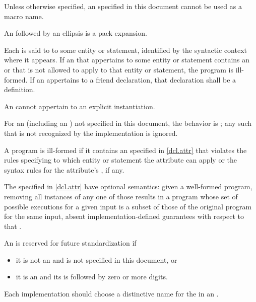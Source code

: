 \pnum
\begin{note}
Unless otherwise specified,
an  specified in this document cannot be used
as a macro name.
\end{note}

\pnum
An  followed by an ellipsis
is a pack expansion.

\pnum
Each  is said to  to some entity or
statement, identified by the syntactic context
where it appears.
If an  that appertains to some
entity or statement contains an  or  that
is not allowed to apply to that
entity or statement, the program is ill-formed. If an 
appertains to a friend declaration, that declaration shall be a
definition.
\begin{note}
An  cannot appertain to
an explicit instantiation.
\end{note}

\pnum
For an 
(including an )
not specified in this document, the
behavior is ;
any such  that is not recognized by the implementation
is ignored.
\begin{note}
A program is ill-formed if it contains an 
specified in \ref{dcl.attr} that violates
the rules specifying to which entity or statement the attribute can apply or
the syntax rules for the attribute's , if any.
\end{note}
\begin{note}
The  specified in \ref{dcl.attr}
have optional semantics:
given a well-formed program,
removing all instances of any one of those 
results in a program whose set of possible executions
for a given input is
a subset of those of the original program for the same input,
absent implementation-defined guarantees
with respect to that .
\end{note}
An  is reserved for future standardization if
\begin{itemize}
\item it is not an  and
is not specified in this document, or
\item it is an  and
its  is
 followed by zero or more digits.
\end{itemize}
Each implementation should choose a distinctive name for the
 in an .

